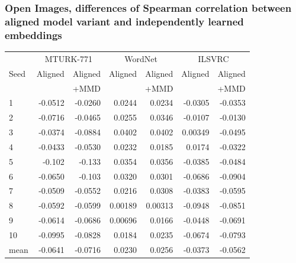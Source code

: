 \subsubsection{Open Images, differences of Spearman correlation between aligned model variant and independently learned embeddings}


\begin{table}[H]
\centering
\begin{tabular}{lrrrrrr}
  \toprule
  
\multicolumn{1}{r}{} & \multicolumn{2}{c}{MTURK-771} & \multicolumn{2}{c}{WordNet} & \multicolumn{2}{c}{ILSVRC} \\
\cmidrule(lr){2-3} \cmidrule(lr){4-5} \cmidrule(lr){6-7}
{Seed} &   Aligned   &  Aligned  &   Aligned &  Aligned  &  Aligned &  Aligned   \\
{}     &             & +MMD      &            & +MMD     &          &   +MMD     \\
\midrule
1    &     -0.0512 &    -0.0260  &   0.0244 &     0.0234 &    -0.0305 &    -0.0353   \\
2    &     -0.0716 &    -0.0465  &   0.0255 &     0.0346 &    -0.0107 &    -0.0130   \\
3    &     -0.0374 &    -0.0884  &   0.0402 &     0.0402 &     0.00349 &    -0.0495   \\
4    &     -0.0433 &    -0.0530  &   0.0232 &     0.0185 &     0.0174 &    -0.0322   \\
5    &     -0.102  &    -0.133   &   0.0354 &     0.0356 &    -0.0385 &    -0.0484   \\
6    &     -0.0650 &    -0.103   &   0.0320 &     0.0301 &    -0.0686 &    -0.0904   \\
7    &     -0.0509 &    -0.0552  &   0.0216 &     0.0308 &    -0.0383 &    -0.0595   \\
8    &     -0.0592 &    -0.0599  &   0.00189 &    0.00313 &   -0.0948 &    -0.0851   \\
9    &     -0.0614 &    -0.0686  &   0.00696 &    0.0166 &    -0.0448 &    -0.0691   \\
10   &     -0.0995 &    -0.0828  &   0.0184 &     0.0235 &    -0.0674 &    -0.0793   \\
\midrule                                                                                          
mean &     -0.0641 &    -0.0716  &   0.0230 &     0.0256 &    -0.0373 &    -0.0562   \\
\bottomrule
\end{tabular}
\end{table}



